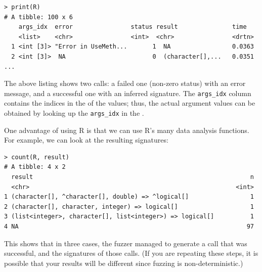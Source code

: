 \documentclass[sigplan,screen]{acmart}
\begin{document}
\begin{lstlisting}
> print(R)
# A tibble: 100 x 6
    args_idx  error                status result               time
    <list>    <chr>                <int>  <chr>                <drtn>
  1 <int [3]> "Error in UseMeth...       1  NA                 0.0363
  2 <int [3]>  NA                        0  (character[],...   0.0351
...
\end{lstlisting}

The above listing shows two calls: a failed one (non-zero status) with an error message, and a successful one with an inferred signature.
The \texttt{args\_idx} column contains the indices in the \sxpdb of the values; thus, the actual argument values can be obtained by looking up the {\tt args\_idx} in the \sxpdb.

One advantage of using R is that we can use R's many data analysis functions.
For example, we can look at the resulting signatures:

\begin{lstlisting}
> count(R, result)
# A tibble: 4 x 2
  result                                                            n
  <chr>                                                         <int>
1 (character[], ^character[], double) => ^logical[]                 1
2 (character[], character, integer) => logical[]                    1
3 (list<integer>, character[], list<integer>) => logical[]          1
4 NA                                                               97
\end{lstlisting}

This shows that in three cases, the fuzzer managed to generate a call that was successful, and the signatures of those calls.
(If you are repeating these steps, it is possible that your results will be different since fuzzing is non-deterministic.)
\end{document}
